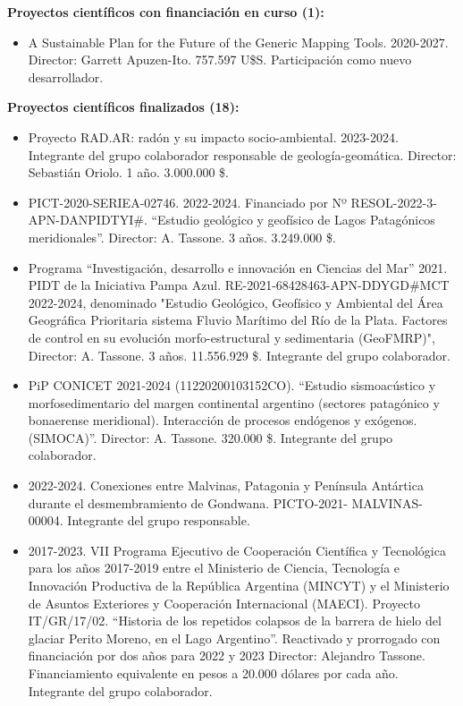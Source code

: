 \documentclass[11pt, a4paper]{article}
\begin{document}
\textbf{Proyectos científicos con financiación en curso (1):}

\begin{itemize}
    \item A Sustainable Plan for the Future of the Generic Mapping Tools. 2020-2027. Director: Garrett Apuzen-Ito. 757.597 U\$S. Participación como nuevo desarrollador.
\end{itemize}

\textbf{Proyectos científicos finalizados (18):}

\begin{itemize}
    \item Proyecto RAD.AR: radón y su impacto socio-ambiental. 2023-2024. Integrante del grupo colaborador responsable de geología-geomática. Director: Sebastián Oriolo. 1 año. 3.000.000 \$.
    \item PICT-2020-SERIEA-02746. 2022-2024. Financiado por Nº RESOL-2022-3-APN-DANPIDTYI\#. “Estudio geológico y geofísico de Lagos Patagónicos meridionales”. Director: A. Tassone. 3 años. 3.249.000 \$.
    \item Programa “Investigación, desarrollo e innovación en Ciencias del Mar” 2021. PIDT de la Iniciativa Pampa Azul. RE-2021-68428463-APN-DDYGD\#MCT 2022-2024, denominado "Estudio Geológico, Geofísico y Ambiental del Área Geográfica Prioritaria sistema Fluvio Marítimo del Río de la Plata. Factores de control en su evolución morfo-estructural y sedimentaria (GeoFMRP)", Director: A. Tassone. 3 años. 11.556.929 \$. Integrante del grupo colaborador.
    \item PiP CONICET 2021-2024 (11220200103152CO). “Estudio sismoacústico y morfosedimentario del margen continental argentino (sectores patagónico y bonaerense meridional). Interacción de procesos endógenos y exógenos. (SIMOCA)”. Director: A. Tassone. 320.000 \$. Integrante del grupo colaborador.
    \item 2022-2024. Conexiones entre Malvinas, Patagonia y Península Antártica durante el desmembramiento de Gondwana. PICTO-2021- MALVINAS- 00004. Integrante del grupo responsable.
    \item 2017-2023. VII Programa Ejecutivo de Cooperación Científica y Tecnológica para los años 2017-2019 entre el Ministerio de Ciencia, Tecnología e Innovación Productiva de la República Argentina (MINCYT) y el Ministerio de Asuntos Exteriores y Cooperación Internacional (MAECI). Proyecto IT/GR/17/02. “Historia de los repetidos colapsos de la barrera de hielo del glaciar Perito Moreno, en el Lago Argentino”. Reactivado y prorrogado con financiación por dos años para 2022 y 2023 Director: Alejandro Tassone. Financiamiento equivalente en pesos a 20.000 dólares por cada año. Integrante del grupo colaborador.

\end{itemize}
\end{document}
